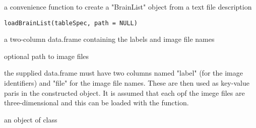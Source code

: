 \begin{Description}\relax
a convenience function to create a "BrainList" object from a text file description
\end{Description}
\begin{Usage}
\begin{verbatim}
loadBrainList(tableSpec, path = NULL)
\end{verbatim}
\end{Usage}
\begin{Arguments}
\begin{ldescription}
\item[\code{tableSpec}] a two-column data.frame containing the labels and
image file names 
\item[\code{path}] optional path to image files 
\end{ldescription}
\end{Arguments}
\begin{Details}\relax
the supplied data.frame must have two columns named "label" (for the
image identifiers) and "file" for the image file names.  These are
then used as key-value paris in the constructed 
object. It is assumed that each opf the imege files are
three-dimensional and this can be loaded with the  function.
\end{Details}
\begin{Value}
an object of class 
\end{Value}

